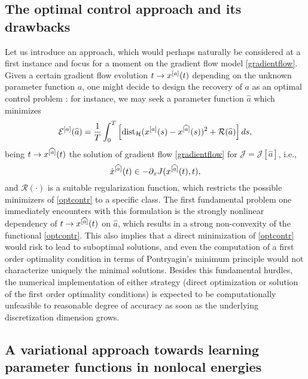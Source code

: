 \subsection{The optimal control approach and its drawbacks}
Let us introduce an approach, which would perhaps naturally be considered at a first instance and focus for a moment on the gradient flow model \eqref{gradientflow}. Given a certain gradient flow evolution $t \to x^{[a]}(t)$ depending on the unknown parameter function $a$, one might decide to design the recovery of $a$ as an optimal control problem \cite{brpi07}: for instance, we may seek a parameter function $\widehat a$ which minimizes
\begin{equation}\label{optcontr}
\mathcal E^{[a]}(\widehat a) = \frac{1}{T}\int_0^T \left [ \operatorname{dist}_{\mathcal H}(x^{[a]}(s) - x^{[\widehat a]}(s))^2 + \mathcal R(\widehat a) \right ] d s ,
\end{equation}
being $t \to x^{[\widehat a]}(t)$ the solution of gradient flow \eqref{gradientflow} for $\mathcal J = \mathcal J[\widehat a]$, i.e.,
\begin{equation}\label{gradientflow2}
\dot{x}^{[\widehat a]}(t) \in - \partial_x J(x^{[\widehat a]}(t),t),
\end{equation}
and $\mathcal R(\cdot)$ is a suitable regularization function, which restricts the possible minimizers of \eqref{optcontr} to a specific class. The first fundamental problem one immediately encounters with this formulation is the strongly nonlinear dependency of $t \to x^{[\widehat a]}(t)$ on $\widehat a$, which results in a strong non-convexity of the functional \eqref{optcontr}. This also implies that a direct minimization of \eqref{optcontr} would risk to lead to suboptimal solutions, and even the computation of a first order optimality condition in terms of Pontryagin's minimum principle would not characterize uniquely the minimal solutions. Besides this fundamental hurdles, the numerical implementation of either strategy (direct optimization or solution of the first order optimality conditions) is expected to be computationally unfeasible to reasonable degree of accuracy as soon as the underlying discretization dimension grows.

\subsection{A variational approach towards learning parameter functions in nonlocal energies}\label{sec:wp2}

